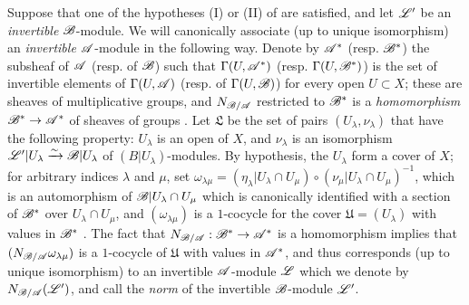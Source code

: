 \begin{env}[6.5.2]
\label{II.6.5.2}
Suppose that one of the hypotheses (I) or (II) of  are satisfied, and let $\mathscr{L}'$ be an \emph{invertible} $\mathscr{B}$-module.
We will canonically associate (up to unique isomorphism) an \emph{invertible} $\mathscr{A}$-module in the following way.
Denote by $\mathscr{A}^*$ (resp. $\mathscr{B}^*$) the subsheaf of $\mathscr{A}$ (resp. of $\mathscr{B}$) such that $\Gamma(U,\mathscr{A}^*)$ (resp. $\Gamma(U,\mathscr{B}^*)$) is the set of invertible elements of $\Gamma(U,\mathscr{A})$ (resp. of $\Gamma(U,\mathscr{B})$) for every open $U\subset X$;
these are sheaves of multiplicative groups, and $N_{\mathscr{B}/\mathscr{A}}$ restricted to $\mathscr{B}^*$ is a \emph{homomorphism} $\sh{B}^*\to\sh{A}^*$ of sheaves of groups .
Let $\mathfrak{L}$ be the set of pairs $(U_\lambda,\nu_\lambda)$ that have the following property: $U_\lambda$ is an open of $X$, and $\nu_\lambda$ is an isomorphism $\mathscr{L}'|U_\lambda\xrightarrow{\sim}\mathscr{B}|U_\lambda$ of $(B|U_\lambda)$-modules.
By hypothesis, the $U_\lambda$ form a cover of $X$;
for arbitrary indices $\lambda$ and $\mu$, set $\omega_{\lambda\mu}=(\eta_\lambda|U_\lambda\cap U_\mu)\circ(\nu_\mu|U_\lambda\cap U_\mu)^{-1}$, which is an automorphism of $\mathscr{B}|U_\lambda\cap U_\mu$ which is canonically identified with a section of $\mathscr{B}^*$ over $U_\lambda\cap U_\mu$, and $(\omega_{\lambda\mu})$ is a $1$-cocycle for the cover $\mathfrak{U}=(U_\lambda)$ with values in $\mathscr{B}^*$ .
The fact that $N_{\sh{B}/\sh{A}}:\sh{B}^*\to\sh{A}^*$ is a homomorphism implies that $(N_{\mathscr{B}/\mathscr{A}}\omega_{\lambda\mu})$ is a $1$-cocycle of $\mathfrak{U}$ with values in $\mathscr{A}^*$, and thus corresponds (up to unique isomorphism) to an invertible $\mathscr{A}$-module $\mathscr{L}$  which we denote by $N_{\mathscr{B}/\mathscr{A}}(\mathscr{L}')$, and call the \emph{norm} of the invertible $\mathscr{B}$-module $\mathscr{L}'$.


\end{env}

